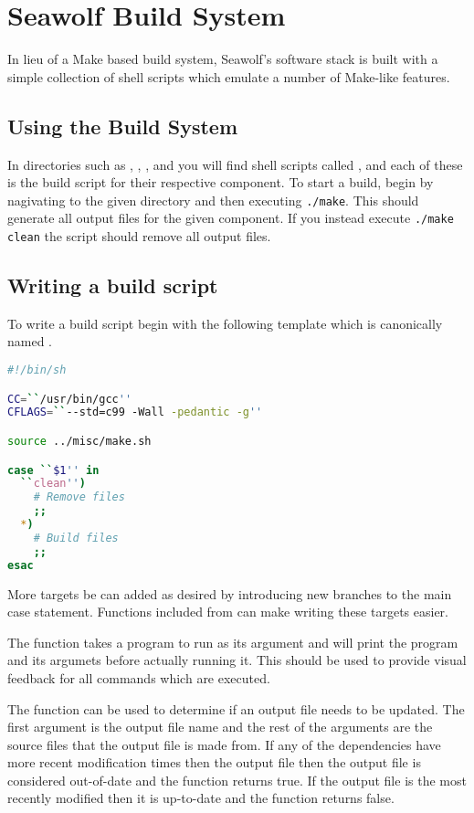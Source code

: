 
\newpage
\section{Seawolf Build System} \label{build}
In lieu of a Make based build system, Seawolf's software stack is built with a
simple collection of shell scripts which emulate a number of Make-like features.

\subsection{Using the Build System} \label{buildusing}
In directories such as , , , and
 you will find shell scripts called , and each of
these is the build script for their respective component. To start a build,
begin by nagivating to the given directory and then executing
\texttt{./make}. This should generate all output files for the given
component. If you instead execute \texttt{./make clean} the script should remove
all output files.

\subsection{Writing a build script} \label{buildwriting}
To write a build script begin with the following template which is canonically
named .

\begin{lstlisting}[language=sh, caption=Build script template]
#!/bin/sh

CC=``/usr/bin/gcc''
CFLAGS=``--std=c99 -Wall -pedantic -g''

source ../misc/make.sh

case ``$1'' in
  ``clean'')
    # Remove files
    ;;
  *)
    # Build files 
    ;;
esac
\end{lstlisting}

More targets be can added as desired by introducing new branches to the main
case statement. Functions included from  can make writing
these targets easier. 

The function  takes a program to run as its argument and will print
the program and its argumets before actually running it. This should be used to
provide visual feedback for all commands which are executed.

The function  can be used to determine if an output file needs
to be updated. The first argument is the output file name and the rest of the
arguments are the source files that the output file is made from. If any of the
dependencies have more recent modification times then the output file then the
output file is considered out-of-date and the function returns true. If the
output file is the most recently modified then it is up-to-date and the function
returns false.

